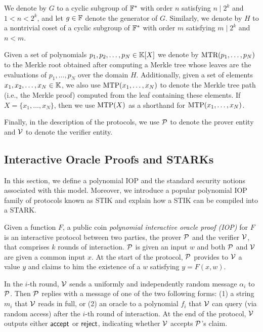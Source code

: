 We denote by $G$ to a cyclic subgroup of $\FF^*$ with order $n$ satisfying $n \mid 2^k$ and $1 < n < 2^k$, and let $g \in \FF$ denote the generator of $G$. Similarly, we denote by $H$ to a nontrivial coset of a cyclic subgroup of $\FF^*$ with order $m$ satisfying $m \mid 2^k$ and $n < m$.

Given a set of polynomials $p_1,p_2,\dots,p_N \in \KK[X]$ we denote by $\MTR(p_1,\dots,p_N)$ to the Merkle root obtained after computing a Merkle tree \cite{C:Merkle87} whose leaves are the evaluations of $p_1,\dots,p_N$ over the domain $H$. Additionally, given a set of elements $x_1,x_2,\dots,x_N \in \KK$, we also use $\MTP(x_1,\dots,x_N)$ to denote the Merkle tree path (i.e., the Merkle proof) computed from the leaf containing these elements. If $X = \{x_1,\dots,x_N\}$, then we use $\MTP(X)$ as a shorthand for $\MTP(x_1,\dots,x_N)$.

Finally, in the description of the protocols, we use $\P$ to denote the prover entity and $\V$ to denote the verifier entity.


\subsection{Interactive Oracle Proofs and STARKs}\label{sec:IOP}


In this section, we define a polynomial IOP \cite{EPRINT:BenChiSpo16} and the standard security notions associated with this model. Moreover, we introduce a popular polynomial IOP family of protocols known as STIK \cite{C:BBHR19} and explain how a STIK can be compiled into a STARK.

\begin{definition}
  Given a function $F$, a public coin \textit{polynomial interactive oracle proof (IOP)} for $F$ is an interactive protocol between two parties, the prover $\P$ and the verifier $\V$, that comprises $k$ rounds of interaction. $\P$ is given an input $w$ and both $\P$ and $\V$ are given a common input $x$. At the start of the protocol, $\P$ provides to $\V$ a value $y$ and claims to him the existence of a $w$ satisfying $y = F(x,w)$. 
  
  In the $i$-th round, $\V$ sends a uniformly and independently random message $\alpha_i$ to $\P$. Then $\P$ replies with a message of one of the two following forms: (1) a string $m_i$ that $\V$ reads in full, or (2) an oracle to a polynomial $f_i$ that $\V$ can query (via random access) after the $i$-th round of interaction. At the end of the protocol, $\V$ outputs either $\accept$ or $\reject$, indicating whether $\V$ accepts $\P$'s claim.
\end{definition}


